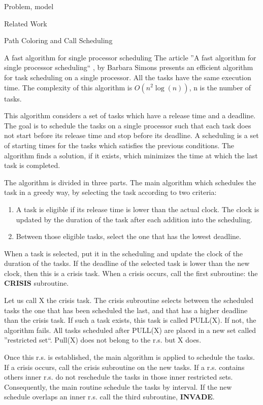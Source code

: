 \documentclass[a4paper,10pt]{report}
\begin{document}
\begin{chapter}{Problem, model}
\begin{section}{Related Work}
\begin{subsection}{Path Coloring and Call Scheduling}
\end{subsection}

\begin{subsection}{A fast algorithm for single processor scheduling}
The article ''A fast algorithm for single processor scheduling`` \cite{simons1978fast}, by Barbara Simons presents an efficient algorithm for task 
scheduling on a single processor. All the tasks have the same execution time. The complexity of this algorithm is $O(n^2\log(n))$, n is the number of tasks.

This algorithm considers a set of tasks which have a release time and a deadline. The goal is to schedule the tasks on a single processor such
that each task does not start before its release time and stop before its deadline.
A scheduling is a set of starting times for the tasks which satisfies the previous conditions.
The algorithm finds a solution, if it exists, which minimizes the time at which the last task is completed.

The algorithm is divided in three parts.
The main algorithm which schedules the task in a greedy way, by selecting the task according to two criteria:
\begin{enumerate}
 \item A task is eligible if its release time is lower than the actual clock. The clock is updated by the duration of the task after each addition into the scheduling.
 \item Between those eligible tasks, select the one that has the lowest deadline.
\end{enumerate}

When a task is selected, put it in the scheduling and update the clock of the duration of the tasks.
If the deadline of the selected task is lower than the new clock, then this is a crisis task.
When a crisis occurs, call the first subroutine: the {\bf CRISIS} subroutine.

Let us call X the crisis task.
The crisis subroutine selects between the scheduled tasks the one that has been scheduled the last, and that has a higher deadline than the crisis task.
If such a task exists, this task is called PULL(X). If not, the algorithm fails.
All tasks scheduled after PULL(X) are placed in a new set called ''restricted set``.
Pull(X) does not belong to the r.s. but X does.

Once this r.s. is established, the main algorithm is applied to schedule the tasks. If a crisis occurs, call the crisis subroutine on the new tasks.
If a r.s. contains others inner r.s. do not reschedule the tasks in those inner restricted sets. Consequently, the main routine schedule 
the tasks by interval. If the new schedule overlaps an inner r.s. call the third subroutine, {\bf INVADE}.


\end{subsection}
\end{section}
\end{chapter}
\end{document}

